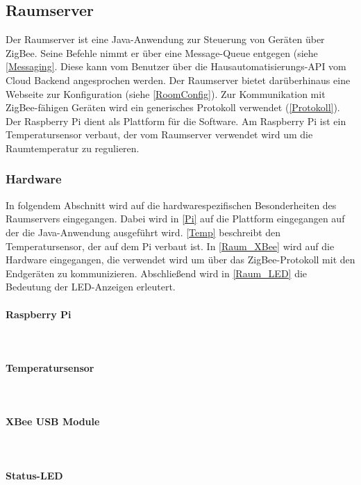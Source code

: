 \subsection{Raumserver}\label{Raumserver}
Der Raumserver ist eine Java-Anwendung zur Steuerung von Geräten über ZigBee. Seine Befehle nimmt er über eine Message-Queue entgegen (siehe \autoref{Messaging}. Diese kann vom Benutzer über die Hausautomatisierungs-API vom Cloud Backend angesprochen werden. Der Raumserver bietet darüberhinaus eine Webseite zur Konfiguration (siehe \autoref{RoomConfig}). Zur Kommunikation mit ZigBee-fähigen Geräten wird ein generisches Protokoll verwendet (\autoref{Protokoll}). Der Raspberry Pi dient als Plattform für die Software. Am Raspberry Pi ist ein Temperatursensor verbaut, der vom Raumserver verwendet wird um die Raumtemperatur zu regulieren.

\subsubsection{Hardware}\label{Raum_Hardware}
In folgendem Abschnitt wird auf die hardwarespezifischen Besonderheiten des Raumservers eingegangen. Dabei wird in \autoref{Pi} auf die Plattform eingegangen auf der die Java-Anwendung ausgeführt wird. \autoref{Temp} beschreibt den Temperatursensor, der auf dem Pi verbaut ist. In \autoref{Raum_XBee} wird auf die Hardware eingegangen, die verwendet wird um über das ZigBee-Protokoll mit den Endgeräten zu kommunizieren. Abschließend wird in \autoref{Raum_LED} die Bedeutung der LED-Anzeigen erleutert.
\paragraph{Raspberry Pi}\mbox{}\\\label{Pi}

\paragraph{Temperatursensor}\mbox{}\\\label{Temp}

\paragraph{XBee USB Module}\mbox{}\\\label{Raum_XBee}

\paragraph{Status-LED}\mbox{}\\\label{Raum_LED}


